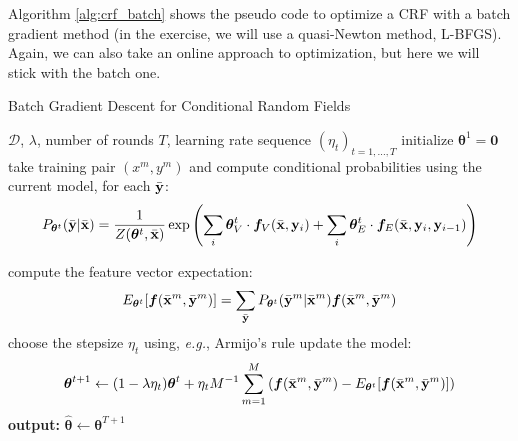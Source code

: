 Algorithm
\ref{alg:crf_batch} shows the pseudo code to optimize a CRF with a batch 
gradient method (in the exercise, we will use a quasi-Newton method, L-BFGS). 
Again, we can also take an online approach to
optimization, but here we will stick with the batch one. 

\begin{algorithm}[t]
   \caption{Batch Gradient Descent for Conditional Random Fields \label{alg:crf_batch}}
\begin{algorithmic}[1]
    $\mathcal{D}$, $\lambda$, number of rounds $T$,
   learning rate sequence $(\eta_t)_{t = 1,\ldots,T}$
   \STATE initialize $\boldsymbol{\theta}^1 = \mathbf{0}$
	\STATE take training pair $(x^m, y^m)$ and compute conditional
        probabilities using the current model, for each $\bar{\mathbf{y}}$:
$$P_{\boldsymbol{\theta}^t}(\bar{\mathbf{y}}|\bar{\mathbf{x}}) = \frac{1}{Z(\boldsymbol{\theta}^t,\bar{\mathbf{x}})}\exp\left(\sum_i \boldsymbol{\theta}^t_V \cdot 
\boldsymbol{f}_V(\bar{\mathbf{x}},\mathbf{y}_i) + 
\sum_i\boldsymbol{\theta}^t_E \cdot
\boldsymbol{f}_E(\bar{\mathbf{x}},\mathbf{y}_i,\mathbf{y}_{i-1})\right)$$

	\STATE compute the feature vector expectation:  
	$$E_{\boldsymbol{\theta}^t}[\boldsymbol{f}(\bar{\mathbf{x}}^m,\bar{\mathbf{y}}^m)] = \sum_{\bar{\mathbf{y}}} P_{\boldsymbol{\theta}^t}(\bar{\mathbf{y}}^m|\bar{\mathbf{x}}^m) \boldsymbol{f}(\bar{\mathbf{x}}^m,\bar{\mathbf{y}}^m)$$
	\ENDFOR
	\STATE choose the stepsize $\eta_t$ using, \emph{e.g.}, Armijo's rule
	\STATE update the model: 
	$$\boldsymbol{\theta}^{t+1} \leftarrow (1-\lambda \eta_t) \boldsymbol{\theta}^{t} + \eta_t M^{-1} \sum_{m=1}^M \left( \boldsymbol{f}(\bar{\mathbf{x}}^m,\bar{\mathbf{y}}^m) 
	- E_{\boldsymbol{\theta}^t}[\boldsymbol{f}(\bar{\mathbf{x}}^m,\bar{\mathbf{y}}^m)]\right)$$
	\ENDFOR
   \STATE \textbf{output:} $\hat{\boldsymbol{\theta}} \leftarrow \boldsymbol{\theta}^{T+1}$
\end{algorithmic}
\end{algorithm}


